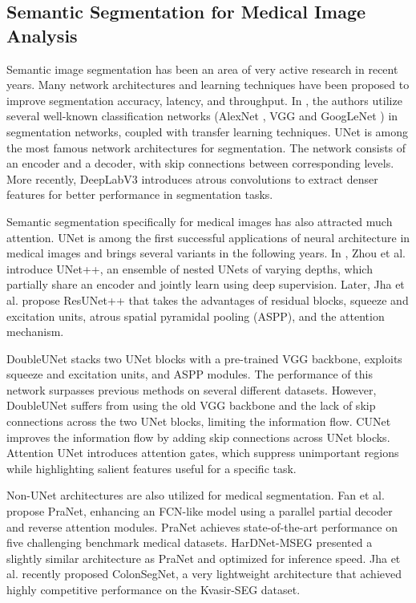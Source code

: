 \documentclass[review, sort&compress]{elsarticle}
\begin{document}
\subsection{Semantic Segmentation for Medical Image Analysis}
Semantic image segmentation has been an area of very active research in recent years. Many network architectures and learning techniques have been proposed to improve segmentation accuracy, latency, and throughput. In \cite{long2015fully}, the authors utilize several well-known classification networks (AlexNet \cite{krizhevsky2012imagenet}, VGG \cite{simonyan2014very} and GoogLeNet \cite{szegedy2015going}) in segmentation networks, coupled with transfer learning techniques. UNet \cite{ronneberger2015u} is among the most famous network architectures for segmentation. The network consists of an encoder and a decoder, with skip connections between corresponding levels. More recently, DeepLabV3 \cite{chen2017rethinking} introduces atrous convolutions to extract denser features for better performance in segmentation tasks.

Semantic segmentation specifically for medical images has also attracted much attention. UNet is among the first successful applications of neural architecture in medical images and brings several variants in the following years. In \cite{zhou2019unet++}, Zhou et al. introduce UNet++, an ensemble of nested UNets of varying depths, which partially share an encoder and jointly learn using deep supervision. Later, Jha et al. \cite{jha2019resunet++} propose ResUNet++ that takes the advantages of residual blocks, squeeze and excitation units, atrous spatial pyramidal pooling (ASPP), and the attention mechanism.

DoubleUNet \cite{jha2020doubleu} stacks two UNet blocks with a pre-trained VGG backbone, exploits squeeze and excitation units, and ASPP modules. The performance of this network surpasses previous methods on several different datasets. However,  DoubleUNet suffers from using the old VGG backbone and the lack of skip connections across the two UNet blocks, limiting the information flow. CUNet \cite{tang2019cu} improves the information flow by adding skip connections across UNet blocks. Attention UNet \cite{oktay2018attention} introduces attention gates, which suppress unimportant regions while highlighting salient features useful for a specific task.

Non-UNet architectures are also utilized for medical segmentation. Fan et al. \cite{fan2020pranet} propose PraNet, enhancing an FCN-like model using a parallel partial decoder and reverse attention modules. PraNet achieves state-of-the-art performance on five challenging benchmark medical datasets.  HarDNet-MSEG \cite{huang2021hardnet} presented a slightly similar architecture as PraNet and optimized for inference speed. Jha et al. \cite{jha2021real} recently proposed ColonSegNet, a very lightweight architecture that achieved highly competitive performance on the Kvasir-SEG dataset.
\end{document}
